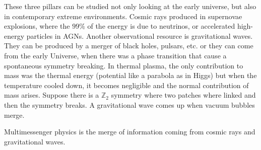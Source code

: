    These three pillars can be studied not only looking at the early universe, but also in contemporary extreme environments. Cosmic rays produced in supernovae explosions, where the $99 \%$ of the energy is due to neutrinos, or accelerated high-energy particles in AGNs. Another observational resource is gravitational waves. They can be produced by a merger of black holes, pulsars, etc. or they can come from the early Universe, when there was a phase transition that cause a spontaneous symmetry breaking. In thermal plasma, the only contribution to mass was the thermal energy (potential like a parabola as in Higgs) but when the temperature cooled down, it becomes negligible and the normal contribution of mass arises. Suppose there is a $\mathbb Z_2$ symmetry where two patches where linked and then the symmetry breaks. A gravitational wave comes up when vacuum bubbles merge.

    Multimessenger physics is the merge of information coming from cosmic rays and gravitational waves.

